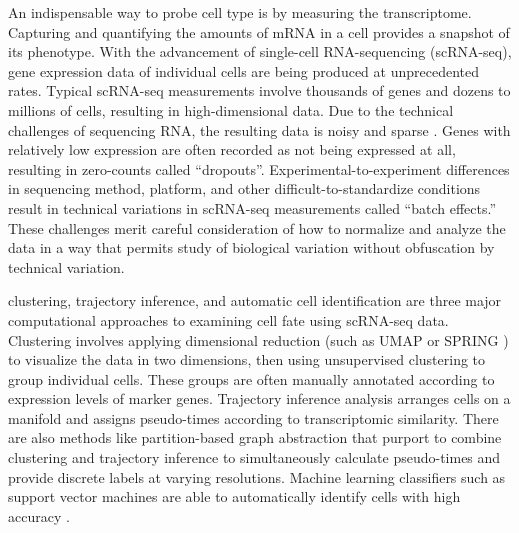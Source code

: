 \documentclass[aps,superscriptaddress, notitlepage,longbibliography]{revtex4-1}
\begin{document}
An indispensable way to probe cell type is by measuring the transcriptome. Capturing and quantifying the amounts of mRNA in a cell provides a snapshot of its phenotype. With the advancement of single-cell RNA-sequencing (scRNA-seq), gene expression data of individual cells are being produced at unprecedented rates. Typical scRNA-seq measurements involve thousands of genes and dozens to millions of cells, resulting in high-dimensional data. Due to the technical challenges of sequencing RNA, the resulting data is noisy and sparse \cite{lahnemann_eleven_2020}. Genes with relatively low expression are often recorded as not being expressed at all, resulting in zero-counts called “dropouts”. Experimental-to-experiment differences in sequencing method, platform, and other difficult-to-standardize conditions result in technical variations in scRNA-seq measurements called “batch effects.” These challenges merit careful consideration of how to normalize and analyze the data in a way that permits study of biological variation without obfuscation by technical variation.

clustering, trajectory inference, and automatic cell identification are three major computational approaches to examining cell fate using scRNA-seq data. Clustering involves applying dimensional reduction (such as UMAP \cite{mcinnes_umap_2018} or SPRING \cite{weinreb_spring_2018}) to visualize the data in two dimensions, then using unsupervised clustering to group individual cells. These groups are often manually annotated according to expression levels of marker genes. Trajectory inference analysis arranges cells on a manifold and assigns pseudo-times according to transcriptomic similarity. There are also methods like partition-based graph abstraction \cite{wolf_paga_2019} that purport to combine clustering and trajectory inference to simultaneously calculate pseudo-times and provide discrete labels at varying resolutions. Machine learning classifiers such as support vector machines are able to automatically identify cells with high accuracy \cite{abdelaal_comparison_2019}.
\end{document}
